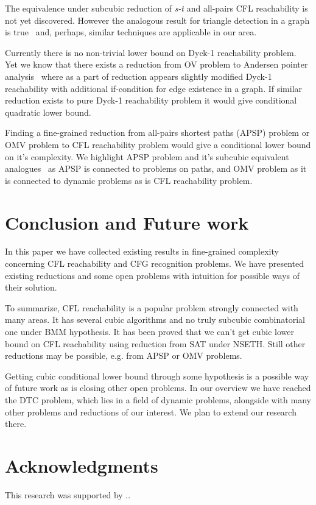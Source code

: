 \documentclass[acmsmall,nonacm]{acmart}
\begin{document}
	The equivalence under subcubic reduction of \emph{s-t} and 
	all-pairs CFL reachability is not yet discovered. However the analogous result for triangle detection in a graph is true~\cite{10.1145/3186893} and, perhaps, similar techniques are applicable in our area. 
	
	Currently there is no non-trivial lower bound on Dyck-1 reachability problem. 
	Yet we know that there exists a reduction from OV problem to Andersen pointer analysis~\cite{10.1145/3434315} where as a part of reduction appears slightly modified Dyck-1 reachability with additional if-condition for edge existence in a graph. If similar reduction exists to pure Dyck-1 reachability problem it would give conditional quadratic lower bound. 
	
	Finding a fine-grained reduction from all-pairs shortest paths (APSP) problem or OMV problem to CFL reachability problem would give a conditional lower bound on it's complexity. We highlight APSP problem and it's subcubic equivalent analogues~\cite{10.1145/3186893} as APSP is connected to problems on paths, and OMV problem as it is connected to dynamic problems as is CFL reachability problem. 
	
	\section{Conclusion and Future work}
	
	In this paper we have collected existing results in fine-grained complexity concerning CFL reachability and CFG recognition problems. We have presented existing reductions and some open problems with intuition for possible ways of their solution. 
	
	To summarize, CFL reachability is a popular problem strongly connected with many areas. It has several cubic algorithms and no truly subcubic combinatorial one under BMM hypothesis. It has been proved that we can't get cubic lower bound on CFL reachability using reduction from SAT under NSETH. Still other reductions may be possible, e.g. from APSP or OMV problems. 
	
	Getting cubic conditional lower bound through some hypothesis is a possible way of future work as is closing other open problems. In our overview we have reached the DTC problem, which lies in a field of dynamic problems, alongside with many other problems and reductions of our interest. We plan to extend our research there. 
	
	\section{Acknowledgments}
	
	This research was supported by ..
	
	
	
	
	\appendix
	
\end{document}
